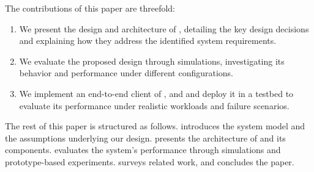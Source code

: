 The contributions of this paper are threefold:
\begin{enumerate}[itemsep=6pt]
    \item We present the design and architecture of \system, detailing the key design decisions and explaining how they address the identified system requirements.
    \item We evaluate the proposed design through simulations, investigating its behavior and performance under different configurations.
    \item We implement an end-to-end client of \system, and and deploy it in a testbed to evaluate its performance under realistic workloads and failure scenarios.
\end{enumerate}

The rest of this paper is structured as follows.
 introduces the system model and the assumptions underlying our design.
 presents the architecture of \system and its components.
 evaluates the system's performance through simulations and prototype-based experiments.
 surveys related work, and  concludes the paper.
